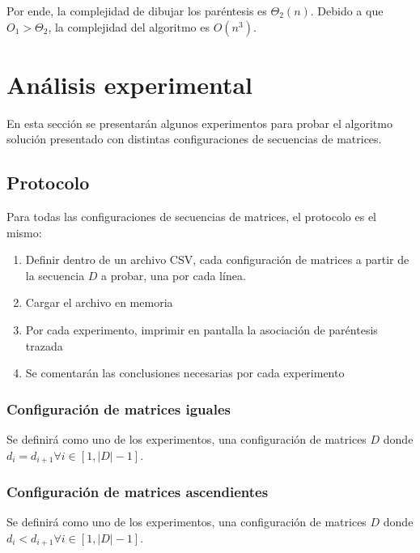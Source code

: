\documentclass[letter]{article}
\begin{document}
Por ende, la complejidad de dibujar los paréntesis es $\Theta_2(n)$. Debido a que $O_1 > \Theta_2$, la complejidad del algoritmo es $O(n^3)$. \par

\section{Análisis experimental} \label{experimentos}

En esta sección se presentarán algunos experimentos para probar el algoritmo solución presentado con distintas configuraciones de secuencias de matrices. \par

\subsection{Protocolo} \label{experimentos:protocolo}

Para todas las configuraciones de secuencias de matrices, el protocolo es el mismo: \par

\begin{enumerate}
    \item Definir dentro de un archivo CSV, cada configuración de matrices a partir de la secuencia $D$ a probar, una por cada línea.
    \item Cargar el archivo en memoria
    \item Por cada experimento, imprimir en pantalla la asociación de paréntesis trazada
    \item Se comentarán las conclusiones necesarias por cada experimento
\end{enumerate}

\subsubsection{Configuración de matrices iguales}

Se definirá como uno de los experimentos, una configuración de matrices $D$ donde $d_i = d_{i+1} \forall i \in [1, |D| - 1]$.

\subsubsection{Configuración de matrices ascendientes}

Se definirá como uno de los experimentos, una configuración de matrices $D$ donde $d_i < d_{i+1} \forall i \in [1, |D| - 1]$.
\end{document}
